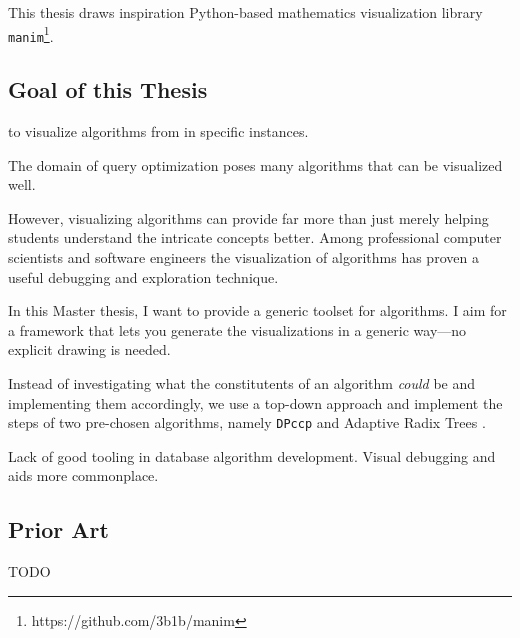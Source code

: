 This thesis draws inspiration Python-based mathematics visualization library \texttt{manim}\footnote{https://github.com/3b1b/manim}.

\subsection{Goal of this Thesis}
to visualize algorithms from in specific instances.

The domain of query optimization poses many algorithms that can be visualized well.

However, visualizing algorithms can provide far more than just merely helping students understand the intricate concepts better.
Among professional computer scientists and software engineers the visualization of algorithms has proven a useful debugging and exploration technique.

In this Master thesis, I want to provide a generic toolset for algorithms. I aim for a framework that lets you generate the visualizations in a generic way—no explicit drawing is needed.

Instead of investigating what the constitutents of an algorithm \textit{could} be and
implementing them accordingly, we use a top-down approach and implement the steps of
two pre-chosen algorithms, namely \texttt{DPccp} \cite{moerkotte2006analysis} and Adaptive Radix Trees \cite{leis2013adaptive}.

Lack of good tooling in database algorithm development.
Visual debugging and aids more commonplace.

\subsection{Prior Art}

TODO